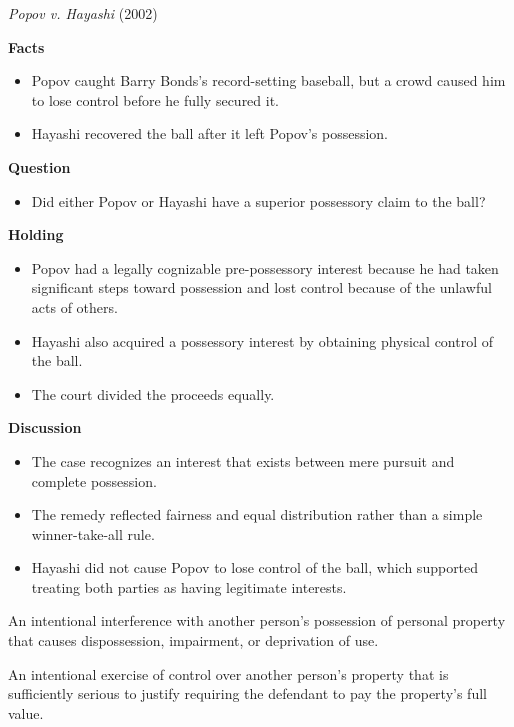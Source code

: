 \documentclass[11pt]{tex/lawoutline}
\begin{document}
\casebox
{\textit{Popov v. Hayashi} (2002)}
{}
{
\textbf{Facts}
\begin{itemize}
    \item Popov caught Barry Bonds's record-setting baseball, but a crowd caused him to lose control before he fully secured it.
    \item Hayashi recovered the ball after it left Popov's possession.
\end{itemize}

\textbf{Question}
\begin{itemize}
    \item Did either Popov or Hayashi have a superior possessory claim to the ball?
\end{itemize}

\textbf{Holding}
\begin{itemize}
    \item Popov had a legally cognizable pre-possessory interest because he had taken significant steps toward possession and lost control because of the unlawful acts of others.
    \item Hayashi also acquired a possessory interest by obtaining physical control of the ball.
    \item The court divided the proceeds equally.
\end{itemize}

\textbf{Discussion}
\begin{itemize}
    \item The case recognizes an interest that exists between mere pursuit and complete possession.
    \item The remedy reflected fairness and equal distribution rather than a simple winner-take-all rule.
    \item Hayashi did not cause Popov to lose control of the ball, which supported treating both parties as having legitimate interests.
\end{itemize}
}

{
An intentional interference with another person's possession of personal property that causes dispossession, impairment, or deprivation of use.
}


{
An intentional exercise of control over another person's property that is sufficiently serious to justify requiring the defendant to pay the property's full value.
}
\end{document}
